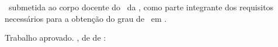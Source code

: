 

% 

\begin{folhadeaprovacao}

    \begin{center}
        {\ABNTEXchapterfont\large\ValorDoNomeCompletoDoAutor{}}

        \vspace*{\fill}\vspace*{\fill}
        \begin{center}
            \ABNTEXchapterfont\bfseries\Large\ValorDoTitulo{}
        \end{center}
        \vspace*{\fill}

        \hspace{.45\textwidth}
        \begin{minipage}{.5\textwidth}
            \ValorDoTipo{}\ submetida ao corpo docente do \ValorDaUnidadeAcademica{}\ da \ValorDaInstituicao{}, como
            parte integrante dos requisitos necess\'arios para a obten\c{c}\~ao do grau de \ValorDoGrau{}\ em \ValorDoCurso{}.
        \end{minipage}%
        \vspace*{\fill}
    \end{center}

    Trabalho aprovado. \ValorDaCidade{}, \ValorDoDia{} de \ValorDoMes{} de \ValorDoAno{}:


    \begin{center}
        \vspace*{0.5cm}
        {\large\imprimirlocal}
        \par
        {\large\imprimirdata}
        \vspace*{1cm}
    \end{center}

\end{folhadeaprovacao}

